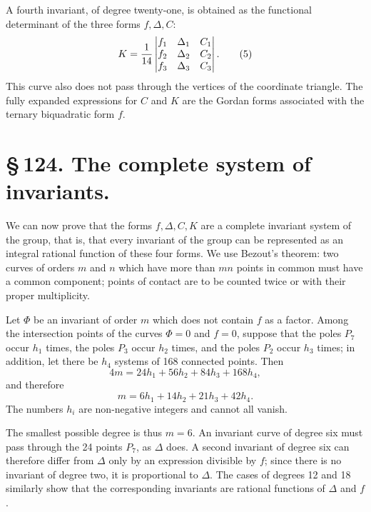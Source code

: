 \documentclass[11pt]{article}
\begin{document}
A fourth invariant, of degree twenty-one, is obtained as the functional determinant of the three forms \(f,\Delta,C\):
\begin{equation}
K={1\over14}
\begin{vmatrix}
f_1&\Delta_1&C_1\\
f_2&\Delta_2&C_2\\
f_3&\Delta_3&C_3
\end{vmatrix}.
\tag{5}
\end{equation}
This curve also does not pass through the vertices of the coordinate triangle. The fully expanded expressions for \(C\) and \(K\) are the Gordan forms associated with the ternary biquadratic form \(f\).

\section*{\S\,124. The complete system of invariants.}

We can now prove that the forms \(f,\Delta,C,K\) are a complete invariant system of the group, that is, that every invariant of the group can be represented as an integral rational function of these four forms. We use Bezout's theorem: two curves of orders \(m\) and \(n\) which have more than \(mn\) points in common must have a common component; points of contact are to be counted twice or with their proper multiplicity.

Let \(\Phi\) be an invariant of order \(m\) which does not contain \(f\) as a factor. Among the intersection points of the curves \(\Phi=0\) and \(f=0\), suppose that the poles \(P_7\) occur \(h_1\) times, the poles \(P_3\) occur \(h_2\) times, and the poles \(P_2\) occur \(h_3\) times; in addition, let there be \(h_4\) systems of 168 connected points. Then
\begin{equation}
4m=24h_1+56h_2+84h_3+168h_4,
\end{equation}
and therefore
\begin{equation}
m=6h_1+14h_2+21h_3+42h_4.
\tag{1}
\end{equation}
The numbers \(h_i\) are non-negative integers and cannot all vanish.

The smallest possible degree is thus \(m=6\). An invariant curve of degree six must pass through the 24 points \(P_7\), as \(\Delta\) does. A second invariant of degree six can therefore differ from \(\Delta\) only by an expression divisible by \(f\); since there is no invariant of degree two, it is proportional to \(\Delta\). The cases of degrees 12 and 18 similarly show that the corresponding invariants are rational functions of \(\Delta\) and \(f\).
\end{document}
